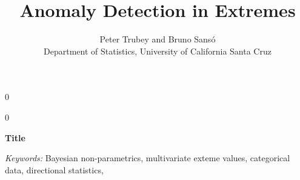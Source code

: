 \documentclass[12pt]{article}
\title{Anomaly Detection in Extremes}
\author{Peter Trubey and Bruno Sans\'o\\
Department of Statistics, University of California Santa Cruz\\
}
\newcommand{\blind}{0}
\begin{document}
\def\spacingset#1{\renewcommand{\baselinestretch}%
{#1}\small\normalsize} \spacingset{1}
\blind
{
  \maketitle
} \fi
{}\blind
{
  \bigskip
  \bigskip
  \bigskip
  \begin{center}
    {\LARGE\bf Title}
\end{center}
  \medskip
} \fi

\bigskip
\begin{abstract}  
  
\end{abstract}

\noindent%
{\it Keywords:}  Bayesian non-parametrics, multivariate exteme values, categorical data, directional statistics, 
\vfill

\newpage
\spacingset{1.8} %







% 











%



\end{document}
